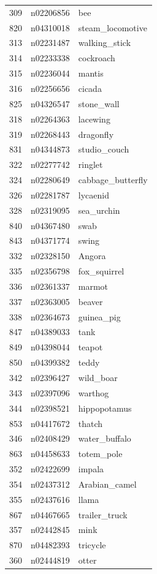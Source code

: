 \begin{table}
\begin{tabular}{cll}
309 & n02206856 & bee \\
820 & n04310018 & steam_locomotive \\
313 & n02231487 & walking_stick \\
314 & n02233338 & cockroach \\
315 & n02236044 & mantis \\
316 & n02256656 & cicada \\
825 & n04326547 & stone_wall \\
318 & n02264363 & lacewing \\
319 & n02268443 & dragonfly \\
831 & n04344873 & studio_couch \\
322 & n02277742 & ringlet \\
324 & n02280649 & cabbage_butterfly \\
326 & n02281787 & lycaenid \\
328 & n02319095 & sea_urchin \\
840 & n04367480 & swab \\
843 & n04371774 & swing \\
332 & n02328150 & Angora \\
335 & n02356798 & fox_squirrel \\
336 & n02361337 & marmot \\
337 & n02363005 & beaver \\
338 & n02364673 & guinea_pig \\
847 & n04389033 & tank \\
849 & n04398044 & teapot \\
850 & n04399382 & teddy \\
342 & n02396427 & wild_boar \\
343 & n02397096 & warthog \\
344 & n02398521 & hippopotamus \\
853 & n04417672 & thatch \\
346 & n02408429 & water_buffalo \\
863 & n04458633 & totem_pole \\
352 & n02422699 & impala \\
354 & n02437312 & Arabian_camel \\
355 & n02437616 & llama \\
867 & n04467665 & trailer_truck \\
357 & n02442845 & mink \\
870 & n04482393 & tricycle \\
360 & n02444819 & otter \\

\end{tabular}
\end{table}
